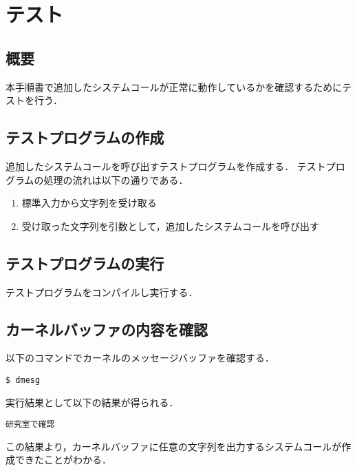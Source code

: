 \documentclass[12pt]{jsarticle}
\begin{document}
\section{テスト}
\subsection{概要}
本手順書で追加したシステムコールが正常に動作しているかを確認するためにテストを行う．

\subsection{テストプログラムの作成}
追加したシステムコールを呼び出すテストプログラムを作成する．
テストプログラムの処理の流れは以下の通りである．
\begin{enumerate}
\item 標準入力から文字列を受け取る
\item 受け取った文字列を引数として，追加したシステムコールを呼び出す 
\end{enumerate}
\subsection{テストプログラムの実行}
テストプログラムをコンパイルし実行する．

\subsection{カーネルバッファの内容を確認}
以下のコマンドでカーネルのメッセージバッファを確認する．
\begin{verbatim}
$ dmesg
\end{verbatim}
実行結果として以下の結果が得られる．
\begin{verbatim}
研究室で確認
\end{verbatim}
この結果より，カーネルバッファに任意の文字列を出力するシステムコールが作成できたことがわかる．
\end{document}
